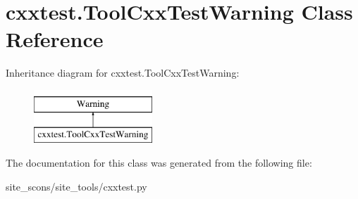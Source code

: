 \hypertarget{classcxxtest_1_1ToolCxxTestWarning}{\section{cxxtest.\-Tool\-Cxx\-Test\-Warning Class Reference}
\label{classcxxtest_1_1ToolCxxTestWarning}
}
Inheritance diagram for cxxtest.\-Tool\-Cxx\-Test\-Warning\-:\begin{figure}[H]
\begin{center}
\leavevmode
\includegraphics[height=2.000000cm]{classcxxtest_1_1ToolCxxTestWarning}
\end{center}
\end{figure}


The documentation for this class was generated from the following file\-:\begin{DoxyCompactItemize}
\item 
site\-\_\-scons/site\-\_\-tools/cxxtest.\-py\end{DoxyCompactItemize}
